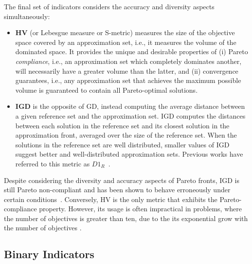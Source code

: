 The final set of indicators considers the accuracy and diversity aspects simultaneously:
\begin{itemize}
\item \textbf{\ac{HV}} (or Lebesgue measure or S-metric) measures the size of the objective space covered by an approximation set, i.e., it measures the volume of the dominated space. It provides the unique and desirable properties of (i) Pareto \textit{compliance}, i.e., an approximation set which completely dominates another, will necessarily have a greater volume than the latter, and (ii) convergence guarantees, i.e., any approximation set that achieves the maximum possible volume is guaranteed to contain all Pareto-optimal solutions.
\item \textbf{\ac{IGD}} is the opposite of \ac{GD}, instead computing the average distance between a given reference set and the approximation set. \ac{IGD} computes the distances between each solution in the reference set and its closest solution in the approximation front, averaged over the size of the reference set. When the solutions in the reference set are well distributed, smaller values of \ac{IGD} suggest better and well-distributed approximation sets. Previous works have referred to this metric as \textbf{$D1_R$}~\cite{Ishibuchi2005GDIGD}. 
\end{itemize}

Despite considering the diversity and accuracy aspects of Pareto fronts, \ac{IGD} is still Pareto non-compliant and has been shown to behave erroneously under certain conditions~\cite{Ishibuchi2005GDIGD}. Conversely, \ac{HV} is the only metric that exhibits the Pareto-compliance property. However, its usage is often impractical in problems, where the number of objectives is greater than ten, due to the its exponential grow with the number of objectives \cite{Ishibuchi2005GDIGD}.

\subsection{Binary Indicators}

